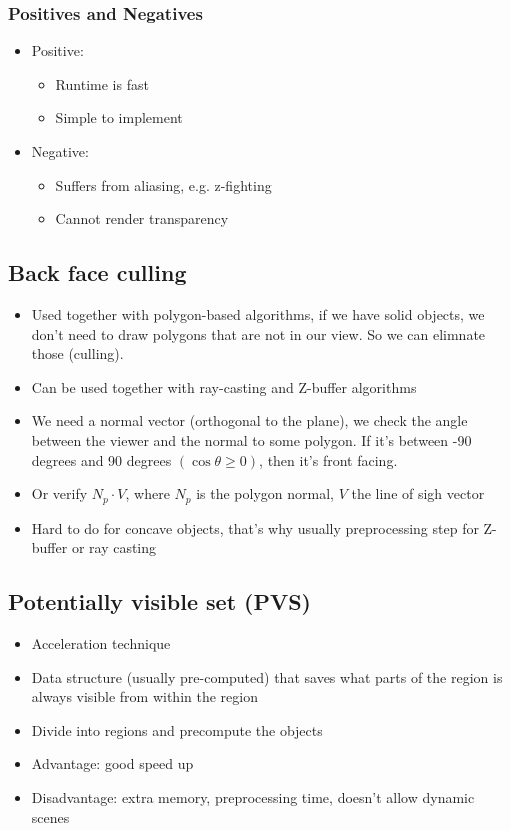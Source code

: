 \documentclass[11pt]{article}
\begin{document}
\subsubsection*{Positives and Negatives}
\begin{itemize}
    \item Positive: \begin{itemize}
        \item Runtime is fast
        \item Simple to implement
    \end{itemize}
    \item Negative: \begin{itemize}
        \item Suffers from aliasing, e.g. z-fighting
        \item Cannot render transparency
    \end{itemize}
    
    
\end{itemize}

\subsection{Back face culling}
\begin{itemize}
    \item Used together with polygon-based algorithms, if we have solid objects, we don't need to draw polygons that are not in our view. So we can elimnate those (culling). 
    \item Can be used together with ray-casting and Z-buffer algorithms
    \item We need a normal vector (orthogonal to the plane), we check the angle between the viewer and the normal to some polygon. If it's between -90 degrees and 90 degrees $(\cos \theta \geq 0)$, then it's front facing.
    \item Or verify $N_p \cdot V$, where $N_p$ is the polygon normal, $V$ the line of sigh vector
    \item Hard to do for concave objects, that's why usually preprocessing step for Z-buffer or ray casting    
\end{itemize}

\subsection{Potentially visible set (PVS)}
\begin{itemize}
    \item Acceleration technique
    \item Data structure (usually pre-computed) that saves what parts of the region is always visible from within the region
    \item Divide into regions and precompute the objects
    \item Advantage: good speed up
    \item Disadvantage: extra memory, preprocessing time, doesn't allow dynamic scenes
\end{itemize}
\end{document}
